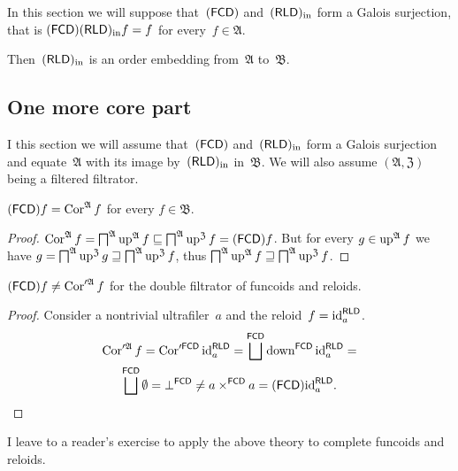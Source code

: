 In this section we will suppose that~$(\mathsf{FCD})$ and~$(\mathsf{RLD})_{\mathrm{in}}$
form a Galois surjection, that is $(\mathsf{FCD})(\mathsf{RLD})_{\mathrm{in}} f = f$
for every~$f\in\mathfrak{A}$.

Then~$(\mathsf{RLD})_{\mathrm{in}}$ is an order embedding from~$\mathfrak{A}$
to~$\mathfrak{B}$.

\subsection{One more core part}

I this section we will assume that~$(\mathsf{FCD})$ and~$(\mathsf{RLD})_{\mathrm{in}}$
form a Galois surjection and equate~$\mathfrak{A}$ with its
image by~$(\mathsf{RLD})_{\mathrm{in}}$ in~$\mathfrak{B}$. We will also assume
$(\mathfrak{A},\mathfrak{Z})$ being a filtered filtrator.

\begin{prop}
$(\mathsf{FCD}) f = \operatorname{Cor}^{\mathfrak{A}} f$ for every $f\in\mathfrak{B}$.
\end{prop}

\begin{proof}
$\operatorname{Cor}^{\mathfrak{A}} f = \bigsqcap^{\mathfrak{A}}\operatorname{up}^{\mathfrak{A}} f \sqsubseteq
\bigsqcap^{\mathfrak{A}}\operatorname{up}^{\mathfrak{Z}} f = (\mathsf{FCD}) f$.
But for every $g\in\operatorname{up}^{\mathfrak{A}} f$ we have
$g=\bigsqcap^{\mathfrak{A}}\operatorname{up}^{\mathfrak{Z}} g \sqsupseteq
\bigsqcap^{\mathfrak{A}}\operatorname{up}^{\mathfrak{Z}} f$, thus
$\bigsqcap^{\mathfrak{A}}\operatorname{up}^{\mathfrak{A}} f \sqsupseteq
\bigsqcap^{\mathfrak{A}}\operatorname{up}^{\mathfrak{Z}} f$.
\end{proof}

\begin{example}
$(\mathsf{FCD}) f \ne \operatorname{Cor}'^{\mathfrak{A}} f$ for the double filtrator
of funcoids and reloids.
\end{example}

\begin{proof}
Consider a nontrivial ultrafiler~$a$ and the reloid~$f={\operatorname{id}}^{\mathsf{RLD}}_a$.
\begin{multline*}
\Cor'^{\mathfrak{A}} f = \Cor'^{\mathsf{FCD}}\id^{\mathsf{RLD}}_a =
\bigsqcup^{\mathsf{FCD}}\down^{\mathsf{FCD}}\id^{\mathsf{RLD}}_a =\\
\bigsqcup^{\mathsf{FCD}}\emptyset = \bot^{\mathsf{FCD}} \ne
a\times^{\mathsf{FCD}}a = \tofcd\id^{\mathsf{RLD}}_a.
\end{multline*}
\end{proof}

I leave to a reader's exercise to apply the above theory to complete funcoids and reloids.

